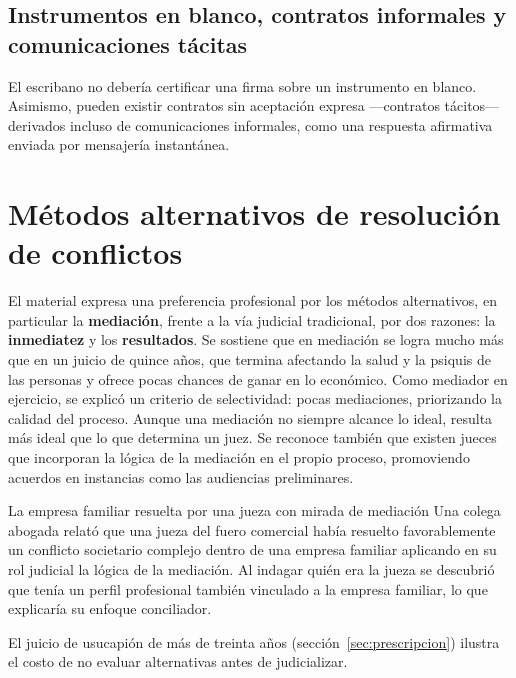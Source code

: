 \documentclass[12pt,oneside]{book}
\begin{document}
\subsection{Instrumentos en blanco, contratos informales y comunicaciones tácitas}

\begin{note}
El escribano no debería certificar una firma sobre un instrumento en blanco. Asimismo, pueden existir contratos sin aceptación expresa ---contratos tácitos--- derivados incluso de comunicaciones informales, como una respuesta afirmativa enviada por mensajería instantánea.
\end{note}

\section{Métodos alternativos de resolución de conflictos}
\label{sec:mediacion}

El material expresa una preferencia profesional por los métodos alternativos, en particular la \textbf{mediación}, frente a la vía judicial tradicional, por dos razones: la \textbf{inmediatez} y los \textbf{resultados}. Se sostiene que en mediación se logra mucho más que en un juicio de quince años, que termina afectando la salud y la psiquis de las personas y ofrece pocas chances de ganar en lo económico. Como mediador en ejercicio, se explicó un criterio de selectividad: pocas mediaciones, priorizando la calidad del proceso. Aunque una mediación no siempre alcance lo ideal, resulta más ideal que lo que determina un juez. Se reconoce también que existen jueces que incorporan la lógica de la mediación en el propio proceso, promoviendo acuerdos en instancias como las audiencias preliminares.

\begin{example}{La empresa familiar resuelta por una jueza con mirada de mediación}
Una colega abogada relató que una jueza del fuero comercial había resuelto favorablemente un conflicto societario complejo dentro de una empresa familiar aplicando en su rol judicial la lógica de la mediación. Al indagar quién era la jueza se descubrió que tenía un perfil profesional también vinculado a la empresa familiar, lo que explicaría su enfoque conciliador.
\end{example}

El juicio de usucapión de más de treinta años (sección~\ref{sec:prescripcion}) ilustra el costo de no evaluar alternativas antes de judicializar.
\end{document}

